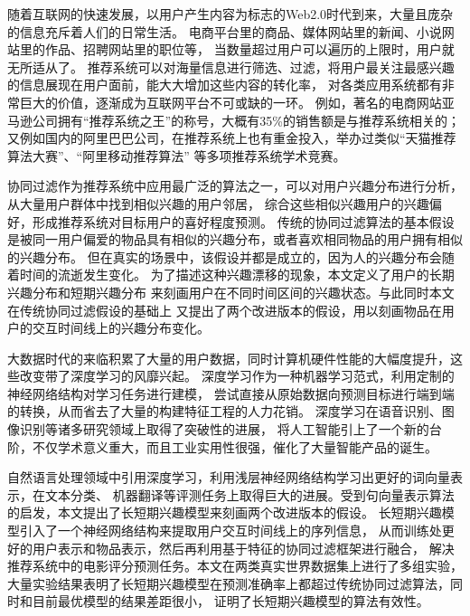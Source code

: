 \begin{cabstract}
随着互联网的快速发展，以用户产生内容为标志的Web2.0时代到来，大量且庞杂的信息充斥着人们的日常生活。
电商平台里的商品、媒体网站里的新闻、小说网站里的作品、招聘网站里的职位等，
当数量超过用户可以遍历的上限时，用户就无所适从了。
推荐系统可以对海量信息进行筛选、过滤，将用户最关注最感兴趣的信息展现在用户面前，能大大增加这些内容的转化率，
对各类应用系统都有非常巨大的价值，逐渐成为互联网平台不可或缺的一环。
例如，著名的电商网站亚马逊公司拥有``推荐系统之王''的称号，大概有35\%的销售额是与推荐系统相关的；
又例如国内的阿里巴巴公司，在推荐系统上也有重金投入，举办过类似``天猫推荐算法大赛''、``阿里移动推荐算法''
等多项推荐系统学术竞赛。

协同过滤作为推荐系统中应用最广泛的算法之一，可以对用户兴趣分布进行分析，从大量用户群体中找到相似兴趣的用户邻居，
综合这些相似兴趣用户的兴趣偏好，形成推荐系统对目标用户的喜好程度预测。
传统的协同过滤算法的基本假设是被同一用户偏爱的物品具有相似的兴趣分布，或者喜欢相同物品的用户拥有相似的兴趣分布。
但在真实的场景中，该假设并都是成立的，因为人的兴趣分布会随着时间的流逝发生变化。
为了描述这种兴趣漂移的现象，本文定义了用户的长期兴趣分布和短期兴趣分布
来刻画用户在不同时间区间的兴趣状态。与此同时本文在传统协同过滤假设的基础上
又提出了两个改进版本的假设，用以刻画物品在用户的交互时间线上的兴趣分布变化。

大数据时代的来临积累了大量的用户数据，同时计算机硬件性能的大幅度提升，这些改变带了深度学习的风靡兴起。
深度学习作为一种机器学习范式，利用定制的神经网络结构对学习任务进行建模，
尝试直接从原始数据向预测目标进行端到端的转换，从而省去了大量的构建特征工程的人力花销。
深度学习在语音识别、图像识别等诸多研究领域上取得了突破性的进展，
将人工智能引上了一个新的台阶，不仅学术意义重大，而且工业实用性很强，催化了大量智能产品的诞生。

自然语言处理领域中引用深度学习，利用浅层神经网络结构学习出更好的词向量表示，在文本分类、
机器翻译等评测任务上取得巨大的进展。受到句向量表示算法的启发，本文提出了长短期兴趣模型来刻画两个改进版本的假设。
长短期兴趣模型引入了一个神经网络结构来提取用户交互时间线上的序列信息，
从而训练处更好的用户表示和物品表示，然后再利用基于特征的协同过滤框架进行融合，
解决推荐系统中的电影评分预测任务。本文在两类真实世界数据集上进行了多组实验，
大量实验结果表明了长短期兴趣模型在预测准确率上都超过传统协同过滤算法，同时和目前最优模型的结果差距很小，
证明了长短期兴趣模型的算法有效性。
\end{cabstract}

